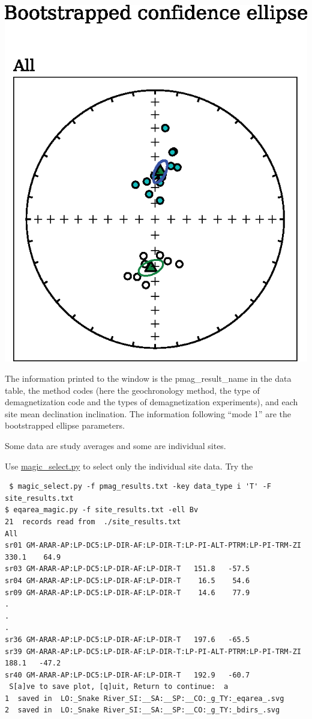 \documentclass[11pt]{book}
\begin{document}
{{%
{%
 \includegraphics[width=12 cm]{EPSfiles/eqarea-magic.eps}}

The information printed to the window is the pmag\_result\_name in the data table, the method codes (here the geochronology method, the type of demagnetization code and the types of demagnetization experiments), and each site mean declination  inclination.    The information following ``mode 1'' are the bootstrapped ellipse parameters.

Some data are study averages and some are individual sites.

 Use \href{#magic_select.py}{magic\_select.py} to select only the individual site data.  Try the

 \begin{verbatim}
 $ magic_select.py -f pmag_results.txt -key data_type i 'T' -F site_results.txt
$ eqarea_magic.py -f site_results.txt -ell Bv
21  records read from  ./site_results.txt
All
sr01 GM-ARAR-AP:LP-DC5:LP-DIR-AF:LP-DIR-T:LP-PI-ALT-PTRM:LP-PI-TRM-ZI   330.1    64.9
sr03 GM-ARAR-AP:LP-DC5:LP-DIR-AF:LP-DIR-T   151.8   -57.5
sr04 GM-ARAR-AP:LP-DC5:LP-DIR-AF:LP-DIR-T    16.5    54.6
sr09 GM-ARAR-AP:LP-DC5:LP-DIR-AF:LP-DIR-T    14.6    77.9
.
.
.
sr36 GM-ARAR-AP:LP-DC5:LP-DIR-AF:LP-DIR-T   197.6   -65.5
sr39 GM-ARAR-AP:LP-DC5:LP-DIR-AF:LP-DIR-T:LP-PI-ALT-PTRM:LP-PI-TRM-ZI   188.1   -47.2
sr40 GM-ARAR-AP:LP-DC5:LP-DIR-AF:LP-DIR-T   192.9   -60.7
 S[a]ve to save plot, [q]uit, Return to continue:  a
1  saved in  LO:_Snake River_SI:__SA:__SP:__CO:_g_TY:_eqarea_.svg
2  saved in  LO:_Snake River_SI:__SA:__SP:__CO:_g_TY:_bdirs_.svg
\end{verbatim}

}}
\end{document}
